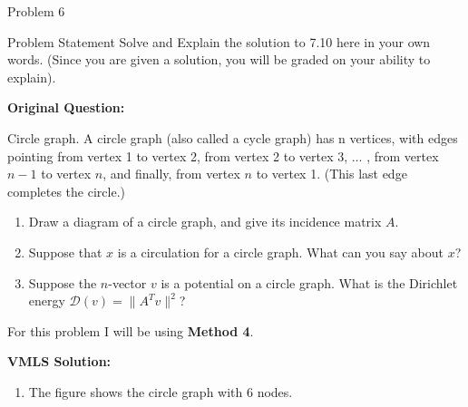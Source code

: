 \begin{problem}{Problem 6}
    \begin{statement}{Problem Statement}
        Solve and Explain the solution to 7.10 here in your own words. (Since you are given a solution, you will be graded on your ability to explain). \vspace*{1em}

        \noindent \textbf{Original Question:} \vspace*{1em}

        Circle graph. A circle graph (also called a cycle graph) has n vertices, with edges pointing from vertex 1 to vertex 2, from vertex 2 to vertex 3, $\dots$ , from vertex $n - 1$ to vertex $n$, and finally, from 
        vertex $n$ to vertex 1. (This last edge completes the circle.)

        \begin{enumerate}[label = (\alph*)]
            \item Draw a diagram of a circle graph, and give its incidence matrix $A$.
            \item Suppose that $x$ is a circulation for a circle graph. What can you say about $x$?
            \item Suppose the $n$-vector $v$ is a potential on a circle graph. What is the Dirichlet energy $\mathcal{D}(v) = \|A^{T}v\|^{2}$?
        \end{enumerate}
    \end{statement}

    \begin{highlight}
        For this problem I will be using \textbf{Method 4}. \vspace*{1em}

        \noindent \textbf{VMLS Solution:} 

        \begin{enumerate}[label = (\alph*)]
            \item The figure shows the circle graph with 6 nodes.
            \begin{center}
\end{center}
\end{enumerate}
\end{highlight}
\end{problem}
